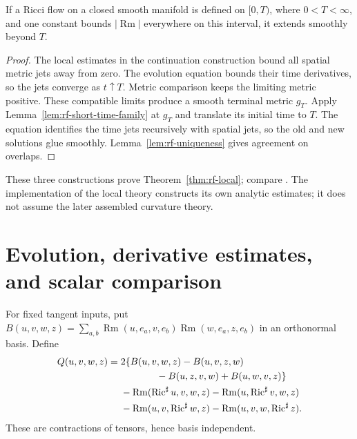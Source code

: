 \begin{lemma}
\label{lem:rf-continuation}
If a Ricci flow on a closed smooth manifold is defined on $[0,T)$,
where $0<T<\infty$, and one constant bounds $|\operatorname{Rm}|$
everywhere on this interval, it extends smoothly beyond $T$.
\end{lemma}
\begin{proof}
The local estimates in the continuation construction bound all spatial
metric jets away from zero. The evolution equation bounds their time
derivatives, so the jets converge as $t\uparrow T$. Metric comparison
keeps the limiting metric positive. These compatible limits produce a
smooth terminal metric $g_T$.
Apply Lemma~\ref{lem:rf-short-time-family} at $g_T$ and translate its
initial time to $T$. The equation identifies the time jets recursively
with spatial jets, so the old and new solutions glue smoothly.
Lemma~\ref{lem:rf-uniqueness} gives agreement on overlaps.
\end{proof}

These three constructions prove Theorem~\ref{thm:rf-local}; compare
\cite[Theorem 3.11, pp.~39--40; Proposition 4.12, p.~68]{MT2007}.
The implementation of the local theory constructs its own analytic
estimates; it does not assume the later assembled curvature theory.

\section{Evolution, derivative estimates, and scalar comparison}
\label{sec:rf-curvature}

For fixed tangent inputs, put
$B(u,v,w,z)=\sum_{a,b}\operatorname{Rm}(u,e_a,v,e_b)
                         \operatorname{Rm}(w,e_a,z,e_b)$
in an orthonormal basis.  Define
\[
\begin{split}
 Q(u,v,w,z)={}&2\{B(u,v,w,z)-B(u,v,z,w)\\
              &\hspace{13mm}-B(u,z,v,w)+B(u,w,v,z)\}\\
 &-\operatorname{Rm}(\operatorname{Ric}^{\sharp}u,v,w,z)
  -\operatorname{Rm}(u,\operatorname{Ric}^{\sharp}v,w,z)\\
 &-\operatorname{Rm}(u,v,\operatorname{Ric}^{\sharp}w,z)
  -\operatorname{Rm}(u,v,w,\operatorname{Ric}^{\sharp}z).
\end{split}
\]
These are contractions of tensors, hence basis independent.

